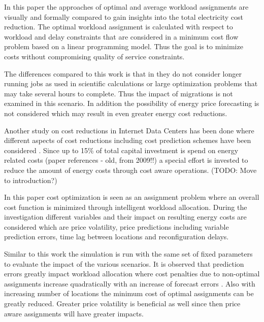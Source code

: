 In this paper the approaches of optimal and average workload assignments are visually and formally compared to gain insights into the total electricity cost reduction. The optimal workload assignment is calculated with respect to workload and delay constraints that are considered in a minimum cost flow problem based on a linear programming model. Thus the goal is to minimize costs without compromising quality of service constraints. 

The differences compared to this work is that in \cite{rao2010minimizing} they do not consider longer running jobs as used in scientific calculations or large optimization problems that may take several hours to complete. Thus the impact of migrations is not examined in this scenario. In addition the possibility of energy price forecasting is not considered which may result in even greater energy cost reductions. 

Another study on cost reductions in Internet Data Centers has been done where different aspects of cost reductions including cost prediction schemes have been considered \cite{de2013study}. Since up to 15\% of total capital investment is spend on energy related costs (paper references \cite{greenberg2008cost} - old, from 2009!!) a special effort is invested to reduce the amount of energy costs through cost aware operations. (TODO: Move to introduction?)

In this paper cost optimization is seen as an assignment problem where an overall cost function is minimized through intelligent workload allocation. During the investigation different variables and their impact on resulting energy costs are considered which are price volatility, price predictions including variable prediction errors, time lag between locations and reconfiguration delays. 

Similar to this work the simulation is run with the same set of fixed parameters to evaluate the impact of the various scenarios. It is observed that prediction errors greatly impact workload allocation where cost penalties due to non-optimal assignments increase quadratically with an increase of forecast errors \cite{de2013study}. Also with increasing number of locations the minimum cost of optimal assignments can be greatly reduced. Greater price volatility is beneficial as well since then price aware assignments will have greater impacts. 

